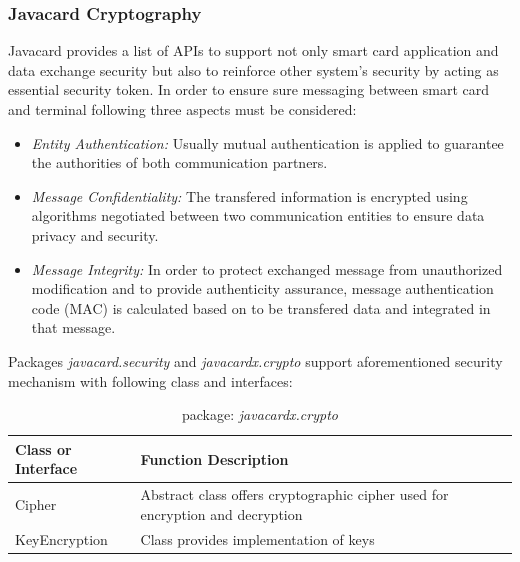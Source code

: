 \documentclass[]{llncs}
\begin{document}
\subsubsection{Javacard Cryptography}
Javacard provides a list of APIs to support not only smart card application and data exchange security but also to reinforce other system's security by acting as essential security token. 
In order to ensure sure messaging between smart card and terminal following three aspects must be considered:
\begin{itemize}
\item \emph{Entity Authentication:} Usually mutual authentication is applied to guarantee the authorities of both communication partners.
\item \emph{Message Confidentiality:} The transfered information is encrypted using algorithms negotiated between two communication entities to ensure data privacy and security.
\item \emph{Message Integrity:} In order to protect exchanged message from unauthorized modification and to provide authenticity assurance, message authentication code (MAC) is calculated based on to be transfered data and integrated in that message.
\end{itemize}
Packages \emph{javacard.security} and \emph{javacardx.crypto} support aforementioned security mechanism with following class and interfaces\cite{chen}:

\begin{table}[ht]
\caption{package: \emph{javacardx.crypto}}
\centering
\begin{tabular}{lllll}
\hline
 Class or Interface & Function Description\\
\hline\hline
Cipher & Abstract class offers cryptographic cipher used for encryption and decryption\\
KeyEncryption & Class provides implementation of keys\\
\hline
\end{tabular}
\label{table:javacardx-crypto}
\end{table}
\end{document}

